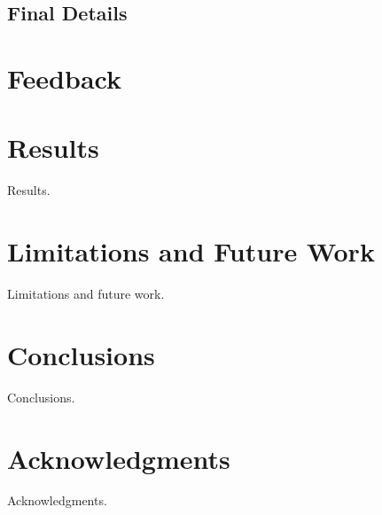\documentclass[conference]{acmsiggraph}
\begin{document}
\subsection{Final Details}


\section{Feedback}

\section{Results}

Results.


\section{Limitations and Future Work}

Limitations and future work.


\section{Conclusions}

Conclusions.

\section{Acknowledgments}

Acknowledgments.



\end{document}
